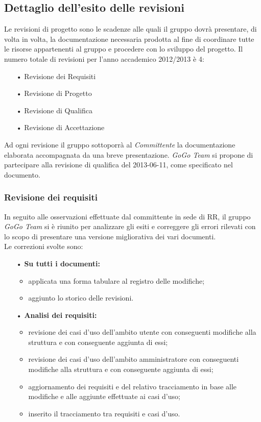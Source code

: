 {	\subsection{Dettaglio dell’esito delle revisioni}{
	Le revisioni di progetto sono le scadenze alle quali il gruppo dovrà presentare, di volta in volta, la documentazione 
	necessaria prodotta al fine di coordinare tutte le risorse appartenenti al gruppo e procedere con lo sviluppo del
	progetto. Il numero totale di revisioni per l’anno accademico 2012/2013 è 4:
	\begin{itemize}
		\item[•] Revisione dei Requisiti
		\item[•] Revisione di Progetto
		\item[•] Revisione di Qualifica
		\item[•] Revisione di Accettazione
	\end{itemize}
	
	Ad ogni revisione il gruppo sottoporrà al \textit{Committente} la documentazione elaborata accompagnata da una breve presentazione. 
	\textit{GoGo Team} si propone di partecipare alla revisione di qualifica del 2013-06-11, come specificato nel documento.
	
	
	\subsubsection{Revisione dei requisiti}{
	In seguito alle osservazioni effettuate dal committente in sede di RR, il gruppo
	\textit{GoGo Team} si è riunito per analizzare gli esiti e correggere gli errori 
	rilevati con lo scopo di presentare una versione migliorativa dei vari
	documenti.\\
	Le correzioni svolte sono:
		\begin{itemize}
		
			\item[•] \textbf{Su tutti i documenti:}
				\begin{itemize}
					\item applicata una forma tabulare al registro delle modifiche;
 					\item aggiunto lo storico delle revisioni.
					\end{itemize}
	 
			\item[•] \textbf{Analisi dei requisiti:}
				\begin{itemize}
					\item revisione dei casi d'uso dell'ambito utente con conseguenti modifiche alla struttura 
					e con conseguente aggiunta di essi;
					\item revisione dei casi d'uso dell'ambito amministratore con conseguenti modifiche alla 
					struttura e con conseguente aggiunta di essi;
					\item aggiornamento dei requisiti e del relativo tracciamento in base alle modifiche e alle 
					aggiunte effettuate ai casi d'uso;
					\item inserito il tracciamento tra requisiti e casi d'uso.
				\end{itemize}
			

\end{itemize}}}}
